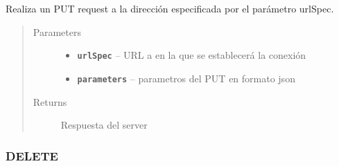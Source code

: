 \documentclass[letterpaper,10pt,english]{sphinxmanual}
\begin{document}
\begin{fulllineitems}
\label{Singletons/ServerHandler:com.fiuba.tallerii.jobify.ServerHandler.PUT(String, String)}
Realiza un PUT request a la dirección especificada por el parámetro urlSpec.
\begin{quote}\begin{description}
\item[{Parameters}] \leavevmode\begin{itemize}
\item {} 
\textbf{\texttt{urlSpec}} -- URL a en la que se establecerá la conexión

\item {} 
\textbf{\texttt{parameters}} -- parametros del PUT en formato json

\end{itemize}

\item[{Returns}] \leavevmode
Respuesta del server

\end{description}\end{quote}

\end{fulllineitems}



\subsubsection{DELETE}
\label{Singletons/ServerHandler:delete}
\end{document}

